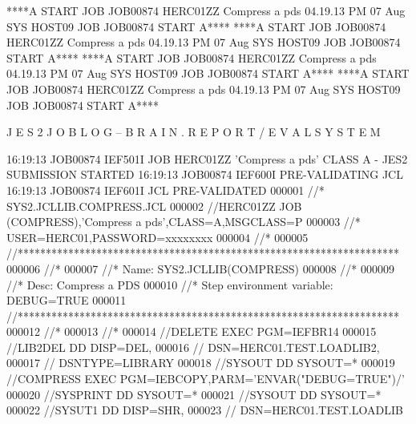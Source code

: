 \documentclass[
11pt,
a4paper,
oneside
]{scrbook}
\begin{document}
\begin{Printout}[
	form=ibm1403,
	paperheight=60,
	bandlines=3,
	feedlines=3,
	fitcolumns=132,
	linenumbers=true,
	punchholes=true,
	fontsize=\scriptsize
	]
****A  START  JOB    JOB00874     HERC01ZZ   Compress a pds   04.19.13 PM 07 Aug  SYS    HOST09     JOB    JOB00874     START  A****
****A  START  JOB    JOB00874     HERC01ZZ   Compress a pds   04.19.13 PM 07 Aug  SYS    HOST09     JOB    JOB00874     START  A****
****A  START  JOB    JOB00874     HERC01ZZ   Compress a pds   04.19.13 PM 07 Aug  SYS    HOST09     JOB    JOB00874     START  A****
****A  START  JOB    JOB00874     HERC01ZZ   Compress a pds   04.19.13 PM 07 Aug  SYS    HOST09     JOB    JOB00874     START  A****


J E S 2   J O B   L O G  --  B R A I N . R E P O R T / E V A L  S Y S T E M

16:19:13 JOB00874 IEF501I JOB HERC01ZZ 'Compress a pds' CLASS A - JES2 SUBMISSION STARTED
16:19:13 JOB00874 IEF600I PRE-VALIDATING JCL
16:19:13 JOB00874 IEF601I JCL PRE-VALIDATED
000001 //* SYS2.JCLLIB.COMPRESS.JCL
000002 //HERC01ZZ JOB (COMPRESS),'Compress a pds',CLASS=A,MSGCLASS=P           
000003 //* USER=HERC01,PASSWORD=xxxxxxxx                                       
000004 //*                                                                     
000005 //********************************************************************  
000006 //*                                                                     
000007 //*  Name: SYS2.JCLLIB(COMPRESS)                                        
000008 //*                                                                     
000009 //*  Desc: Compress a PDS                                               
000010 //*  Step environment variable: DEBUG=TRUE                              
000011 //********************************************************************  
000012 //*                                                                     
000013 //*                                                                     
000014 //DELETE   EXEC PGM=IEFBR14                                             
000015 //LIB2DEL  DD   DISP=DEL,                                               
000016 //              DSN=HERC01.TEST.LOADLIB2,                               
000017 //              DSNTYPE=LIBRARY                                         
000018 //SYSOUT   DD   SYSOUT=*                                                
000019 //COMPRESS EXEC PGM=IEBCOPY,PARM='ENVAR("DEBUG=TRUE")/'                 
000020 //SYSPRINT DD   SYSOUT=*                                                
000021 //SYSOUT   DD   SYSOUT=*                                                
000022 //SYSUT1   DD   DISP=SHR,                                               
000023 //              DSN=HERC01.TEST.LOADLIB                                 

\end{Printout}
\end{document}
